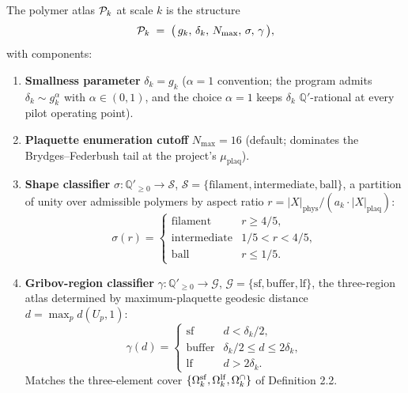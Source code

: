 \begin{definition}
\label{def:poly-atlas}
The polymer atlas $\mathcal{P}_k$ at scale $k$ is the structure
\begin{equation*}
  \mathcal{P}_k \;=\; \bigl(\, g_k, \,\delta_k, \,N_{\max}, \,\sigma, \,\gamma \,\bigr),
\end{equation*}
with components:
\begin{enumerate}
  \item \textbf{Smallness parameter} $\delta_k = g_k$ ($\alpha = 1$
    convention; the program admits $\delta_k \sim g_k^\alpha$ with
    $\alpha \in (0,1)$, and the choice $\alpha = 1$ keeps $\delta_k$
    $\mathbb{Q}'$-rational at every pilot operating point).
  \item \textbf{Plaquette enumeration cutoff} $N_{\max} = 16$ (default;
    dominates the Brydges--Federbush tail at the project's $\mu_{\mathrm{plaq}}$).
  \item \textbf{Shape classifier} $\sigma \colon \mathbb{Q}'_{\ge 0} \to \mathcal{S}$,
    $\mathcal{S} = \{\mathrm{filament}, \mathrm{intermediate}, \mathrm{ball}\}$,
    a partition of unity over admissible polymers by aspect ratio
    $r = |X|_{\mathrm{phys}} / (a_k \cdot |X|_{\mathrm{plaq}})$:
    \[
      \sigma(r) = \begin{cases}
        \mathrm{filament} & r \ge 4/5, \\
        \mathrm{intermediate} & 1/5 < r < 4/5, \\
        \mathrm{ball} & r \le 1/5.
      \end{cases}
    \]
  \item \textbf{Gribov-region classifier} $\gamma \colon \mathbb{Q}'_{\ge 0} \to \mathcal{G}$,
    $\mathcal{G} = \{\mathrm{sf}, \mathrm{buffer}, \mathrm{lf}\}$, the
    three-region atlas determined by maximum-plaquette geodesic distance
    $d = \max_p d(U_p, 1)$:
    \[
      \gamma(d) = \begin{cases}
        \mathrm{sf} & d < \delta_k / 2, \\
        \mathrm{buffer} & \delta_k / 2 \le d \le 2 \delta_k, \\
        \mathrm{lf} & d > 2 \delta_k.
      \end{cases}
    \]
    Matches the three-element cover $\{\Omega_k^{\mathrm{sf}}, \Omega_k^{\mathrm{lf}}, \Omega_k^{\cap}\}$ of
     Definition 2.2.
\end{enumerate}
\end{definition}

